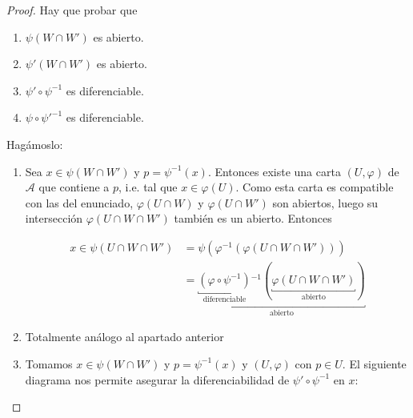 \documentclass[../VD.tex]{subfiles}
\begin{document}
\begin{proof}
  Hay que probar que
  \begin{enumerate}
  \item \label{proof:cta-psi-abierto} \(\psi(W \cap W')\) es abierto.
  \item \label{proof:cta-psi'-abierto} \(\psi'(W \cap W')\) es abierto.
  \item \label{proof:cta-cambio'-dif}\(\psi' \circ \psi^{-1}\) es diferenciable.
  \item \label{proof:cta-cambio-dif} \(\psi \circ \psi'^{-1}\) es diferenciable.
  \end{enumerate}

  Hagámoslo:

  \begin{enumerate}
  \item[\ref{proof:cta-psi-abierto}.]
    \begin{subproof}
      Sea \(x \in \psi(W \cap W')\) y \(p = \psi^{-1}(x)\). Entonces existe una
      carta \((U,\varphi)\) de \(\mathcal{A}\) que contiene a \(p\), i.e. tal que
      \(x \in \varphi(U)\). Como esta carta es compatible con las del enunciado,
      \(\varphi(U \cap W)\) y \(\varphi(U \cap W')\) son abiertos, luego su
      intersección \(\varphi(U \cap W \cap W')\) también es un abierto. Entonces

    \begin{align*}
      x \in \psi(U \cap W \cap W')
      &= \psi(\varphi^{-1}(\varphi(U \cap W \cap W')))\\
      &= \underbracket{\underbracket{(\varphi \circ \psi^{-1})}_{\text{diferenciable}}{}^{-1} (
        \underbracket{\varphi(U \cap W \cap W')}_{\text{abierto}}
        )}_{\text{abierto}}
    \end{align*}
  \end{subproof}

  \item[\ref{proof:cta-psi'-abierto}.]
  \begin{subproof}
    Totalmente análogo al apartado anterior
  \end{subproof}

  \item[\ref{proof:cta-cambio'-dif}.]
  \begin{subproof}
    Tomamos \(x \in \psi(W \cap W')\) y \(p = \psi^{-1}(x)\) y \((U,\varphi)\)
    con \(p \in U\). El siguiente diagrama nos permite asegurar la
    diferenciabilidad de \(\psi' \circ \psi^{-1}\) en \(x\):


\end{subproof}
\end{enumerate}
\end{proof}
\end{document}
